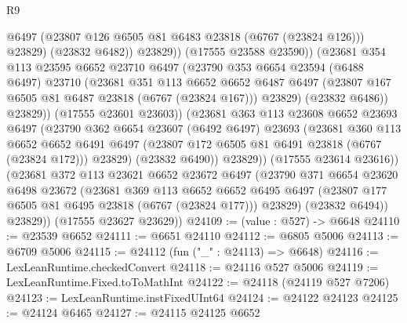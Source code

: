 \begin{lexlean}{R9}
\begin{coremodule}
                          @6497
                          (@23807 @126 @6505 @81 @6483 @23818 (@6767 (@23824 @126)))
                          @23829)
                        (@23832 @6482))
                      @23829))
                  (@17555 @23588 @23590))
                (@23681
                  @354
                  @113
                  @23595
                  @6652
                  @23710
                  @6497
                  (@23790
                    @353
                    @6654
                    @23594
                    (@6488 @6497)
                    @23710
                    (@23681
                      @351
                      @113
                      @6652
                      @6652
                      @6487
                      @6497
                      (@23807 @167 @6505 @81 @6487 @23818 (@6767 (@23824 @167)))
                      @23829)
                    (@23832 @6486))
                  @23829))
              (@17555 @23601 @23603))
            (@23681
              @363
              @113
              @23608
              @6652
              @23693
              @6497
              (@23790
                @362
                @6654
                @23607
                (@6492 @6497)
                @23693
                (@23681
                  @360
                  @113
                  @6652
                  @6652
                  @6491
                  @6497
                  (@23807 @172 @6505 @81 @6491 @23818 (@6767 (@23824 @172)))
                  @23829)
                (@23832 @6490))
              @23829))
          (@17555 @23614 @23616))
        (@23681
          @372
          @113
          @23621
          @6652
          @23672
          @6497
          (@23790
            @371
            @6654
            @23620
            @6498
            @23672
            (@23681
              @369
              @113
              @6652
              @6652
              @6495
              @6497
              (@23807 @177 @6505 @81 @6495 @23818 (@6767 (@23824 @177)))
              @23829)
            (@23832 @6494))
          @23829))
      (@17555 @23627 @23629))
@24109 := (value : @527) -> @6648
@24110 := @23539 @6652
@24111 := @6651 @24110
@24112 := @6805 @5006
@24113 := @6709 @5006
@24115 := @24112 (fun ("_" : @24113) => @6648)
@24116 := LexLeanRuntime.checkedConvert
@24118 := @24116 @527 @5006
@24119 := LexLeanRuntime.Fixed.toToMathInt
@24122 := @24118 (@24119 @527 @7206)
@24123 := LexLeanRuntime.instFixedUInt64
@24124 := @24122 @24123
@24125 := @24124 @6465
@24127 := @24115 @24125 @6652

\end{coremodule}
\end{lexlean}
